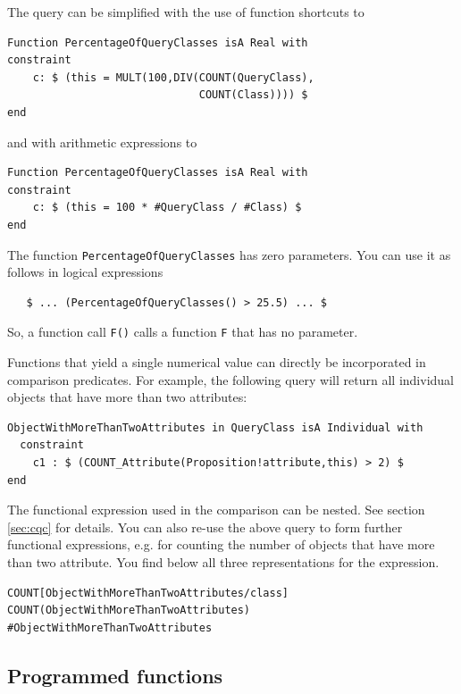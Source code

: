 \begin{enumerate}
The query can be simplified with the use of function shortcuts to 

{\small
\begin{verbatim}
Function PercentageOfQueryClasses isA Real with
constraint
    c: $ (this = MULT(100,DIV(COUNT(QueryClass),
                              COUNT(Class)))) $
end
\end{verbatim}
}

and with arithmetic expressions to

{\small
\begin{verbatim}
Function PercentageOfQueryClasses isA Real with
constraint
    c: $ (this = 100 * #QueryClass / #Class) $ 
end
\end{verbatim}
}

The function {\tt PercentageOfQueryClasses} has zero parameters.
You can use it as follows in logical expressions

{\small
\begin{verbatim}
   $ ... (PercentageOfQueryClasses() > 25.5) ... $
\end{verbatim}
}

So, a function call {\tt F()} calls a function {\tt F} that has no parameter.

\end{enumerate}

Functions that yield a single numerical value can directly be incorporated in comparison
predicates. For example, the following query will return all individual objects that have more than
two attributes:

{\small
\begin{verbatim}
ObjectWithMoreThanTwoAttributes in QueryClass isA Individual with
  constraint
    c1 : $ (COUNT_Attribute(Proposition!attribute,this) > 2) $
end
\end{verbatim}
}

The functional expression used in the comparison can be nested. See section
\ref{sec:cqc} for details. You can also re-use the above query to form
further functional expressions, e.g. for counting the number of objects that
have more than two attribute. You find below all three representations for
the expression. 

{\small
\begin{verbatim}
COUNT[ObjectWithMoreThanTwoAttributes/class]
COUNT(ObjectWithMoreThanTwoAttributes)
#ObjectWithMoreThanTwoAttributes
\end{verbatim}
}


\subsection{Programmed functions}
\label{sec:UserFunctions}

